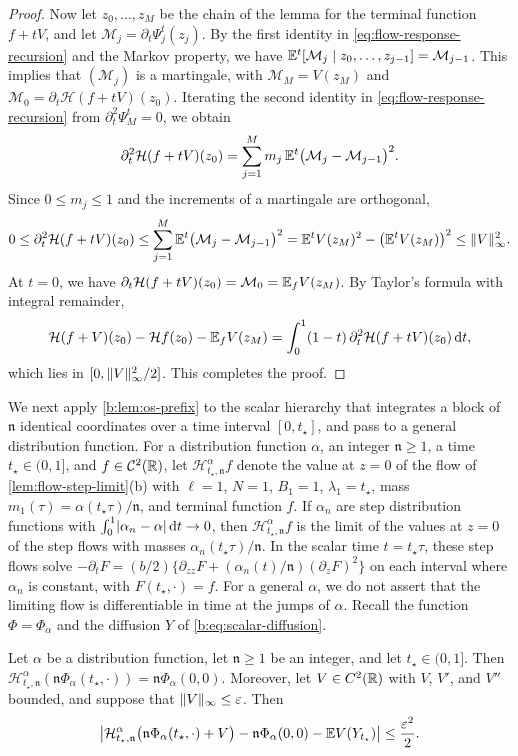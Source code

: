 \begin{proof}
Now let $z_0,\dots,z_M$ be the chain of the lemma for the terminal function $f+tV$,
and let $\mathcal M_j=\partial_t\Psi^t_j(z_j)$. By the first identity in
\eqref{eq:flow-response-recursion} and the Markov property, we have
$\mathbb E^t[\mathcal M_j\mid z_0,\dots,z_{j-1}]=\mathcal M_{j-1}$. This implies that
$(\mathcal M_j)$ is a martingale, with $\mathcal M_M=V(z_M)$ and
$\mathcal M_0=\partial_t\mathcal H(f+tV)(z_0)$. Iterating the second identity in
\eqref{eq:flow-response-recursion} from $\partial^2_t\Psi^t_M=0$, we obtain
\[
 \partial_t^2\mathcal H(f+tV)(z_0)=\sum_{j=1}^Mm_j\,\mathbb E^t\bigl(\mathcal M_j-\mathcal M_{j-1}\bigr)^2.
\]
Since $0\le m_j\le1$ and the increments of a martingale are orthogonal,
\[
 0\le\partial_t^2\mathcal H(f+tV)(z_0)\le\sum_{j=1}^M\mathbb E^t\bigl(\mathcal M_j-\mathcal M_{j-1}\bigr)^2
 =\mathbb E^tV(z_M)^2-\bigl(\mathbb E^tV(z_M)\bigr)^2\le\lVert V\rVert_\infty^2.
\]
At $t=0$, we have $\partial_t\mathcal H(f+tV)(z_0)=\mathcal M_0=\mathbb E_fV(z_M)$. By
Taylor's formula with integral remainder,
\[
 \mathcal H(f+V)(z_0)-\mathcal Hf(z_0)-\mathbb E_fV(z_M)
 =\int_0^1(1-t)\,\partial_t^2\mathcal H(f+tV)(z_0)\,\mathrm d t,
\]
which lies in $[0,\lVert V\rVert_\infty^2/2]$. This completes the proof.
\end{proof}

We next apply \cref{b:lem:os-prefix} to the scalar hierarchy that integrates a
block of $\mathfrak n$ identical coordinates over a time interval $[0,t_\star]$, and pass to
a general distribution function. For a distribution function $\alpha$, an
integer $\mathfrak n\ge1$, a time $t_\star\in(0,1]$, and $f\in\mathcal C^2(\mathbb R)$, let
$\mathcal H^\alpha_{t_\star,\mathfrak n}f$ denote the value at $z=0$ of the flow of
\cref{lem:flow-step-limit}(b) with $\ell=1$, $N=1$, $B_1=1$, $\lambda_1=t_\star$,
mass $m_1(\tau)=\alpha(t_\star\tau)/\mathfrak n$, and terminal function $f$. If
$\alpha_n$ are step distribution functions with $\int_0^1\lvert \alpha_n-\alpha\rvert\,\mathrm d t\to0$,
then $\mathcal H^\alpha_{t_\star,\mathfrak n}f$ is the limit of the values at $z=0$ of the
step flows with masses $\alpha_n(t_\star\tau)/\mathfrak n$. In the scalar time
$t=t_\star\tau$, these step flows solve
$-\partial_tF=(b/2)\{\partial_{zz}F+(\alpha_n(t)/\mathfrak n)(\partial_zF)^2\}$ on each
interval where $\alpha_n$ is constant, with $F(t_\star,\cdot)=f$. For a general
$\alpha$, we do not assert that the limiting flow is differentiable in time at
the jumps of $\alpha$. Recall the function $\Phi=\Phi_\alpha$ and the diffusion
$Y$ of \eqref{b:eq:scalar-diffusion}.

\begin{corollary}\label{cor:flow-prefix}
Let $\alpha$ be a distribution function, let $\mathfrak n\ge1$ be an integer, and let
$t_\star\in(0,1]$. Then $\mathcal H^\alpha_{t_\star,\mathfrak n}(\mathfrak n\Phi_\alpha(t_\star,\cdot))
=\mathfrak n\Phi_\alpha(0,0)$. Moreover, let $V\in C^2(\mathbb R)$ with $V$, $V'$, and $V''$ bounded,
and suppose that $\lVert V\rVert_\infty\le\varepsilon$. Then
\[
 \bigl\lvert\mathcal H^\alpha_{t_\star,\mathfrak n}\bigl(\mathfrak n\Phi_\alpha(t_\star,\cdot)+V\bigr)
 -\mathfrak n\Phi_\alpha(0,0)-\mathbb E V(Y_{t_\star})\bigr\rvert\le\frac{\varepsilon^2}{2}.
\]
\end{corollary}

